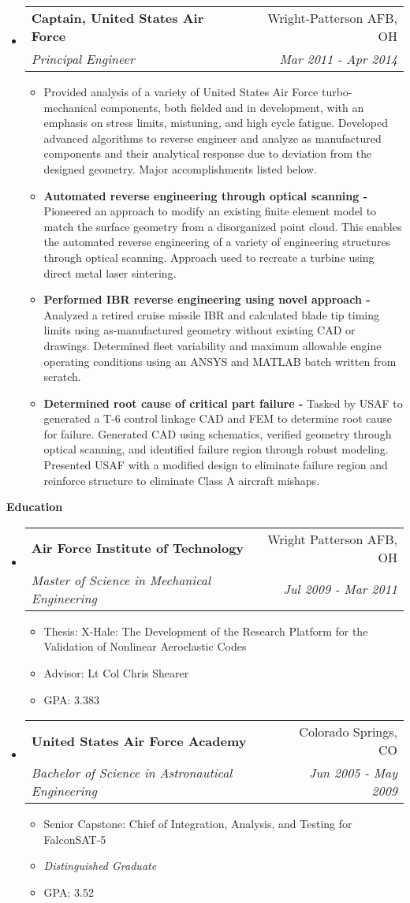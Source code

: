\documentclass[letterpaper,11pt]{article}
\makeatletter
\newcommand{\resitem}[1]{\item #1 \vspace{-2pt}}
\newcommand{\resheading}[1]{{\large \colorbox{mygrey}{\begin{minipage}{\textwidth}{\textbf{#1 \vphantom{p\^{E}}}}\end{minipage}}}}
\newcommand{\ressubheading}[4]{
\begin{tabular*}{7.0in}{l@{\extracolsep{\fill}}r}
		\textbf{#1} & #2 \\
		\textit{#3} & \textit{#4} \\
\end{tabular*}\vspace{-6pt}}
\makeatother
\begin{document}
\begin{itemize}
\item
  \ressubheading{Captain, United States Air Force}{Wright-Patterson AFB, OH}{Principal Engineer}{Mar 2011 - Apr 2014}
  \begin{itemize}
    \resitem{Provided analysis of a variety of United States Air Force turbo-mechanical components, both fielded and in development, with an emphasis on stress limits, mistuning, and high cycle fatigue.  Developed advanced algorithms to reverse engineer and analyze as manufactured components and their analytical response due to deviation from the designed geometry.  Major accomplishments listed below.}
    \resitem{\textbf{Automated reverse engineering through optical scanning - }  Pioneered an approach to modify an existing finite element model to match the surface geometry from a disorganized point cloud.  This enables the automated reverse engineering	of a variety of engineering structures through optical scanning.  Approach used to recreate a turbine using direct metal laser sintering.}
    \resitem{\textbf{Performed IBR reverse engineering using novel approach - }  Analyzed a retired cruise missile IBR and calculated blade tip timing limits using as-manufactured geometry without existing CAD or drawings.  Determined fleet variability and maximum allowable engine operating conditions using an ANSYS and MATLAB batch written from scratch.}
    \resitem{\textbf{Determined root cause of critical part failure -}  Tasked by USAF to generated a T-6 control linkage CAD and FEM to determine root cause for failure.  Generated CAD using schematics, verified geometry through optical scanning, and identified failure region through robust modeling.  Presented USAF with a modified design to eliminate failure region and reinforce structure to eliminate Class A aircraft mishaps.}
  \end{itemize}

\end{itemize}


\resheading{Education}
\begin{itemize}
\item
  \ressubheading{Air Force Institute of Technology}{Wright Patterson AFB, OH}{Master of Science in Mechanical Engineering}{Jul 2009 - Mar 2011}
  \begin{itemize}
    \resitem{Thesis: X-Hale: The Development of the Research Platform for the Validation of Nonlinear Aeroelastic Codes}
    \resitem{Advisor: Lt Col Chris Shearer}
    \resitem{GPA: 3.383}
  \end{itemize}

\item
  \ressubheading{United States Air Force Academy}{Colorado Springs, CO}{Bachelor of Science in Astronautical Engineering}{Jun 2005 - May 2009}
  \begin{itemize}
    \resitem{Senior Capstone: Chief of Integration, Analysis, and Testing for FalconSAT-5}
    \resitem{\emph{Distinguished Graduate}}
    \resitem{GPA: 3.52}
  \end{itemize}

\end{itemize}
\end{document}
